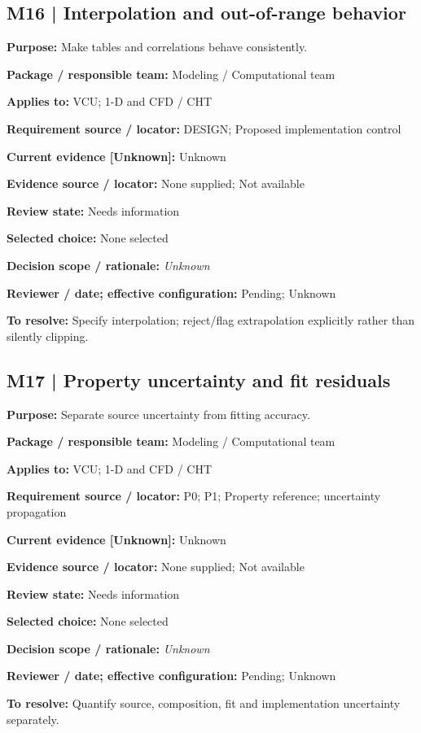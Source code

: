 \documentclass[11pt]{article}
\begin{document}
\par\noindent\begin{minipage}{\textwidth}\small\setlength{\parskip}{2pt}
\subsection*{M16 | Interpolation and out-of-range behavior}
\textbf{Purpose:} Make tables and correlations behave consistently.\par
\textbf{Package / responsible team:} Modeling / Computational team\par
\textbf{Applies to:} VCU; 1-D and CFD / CHT\par
\textbf{Requirement source / locator:} DESIGN; Proposed implementation control\par
\textbf{Current evidence [Unknown]:} Unknown\par
\textbf{Evidence source / locator:} None supplied; Not available\par
\textbf{Review state:} Needs information\par
\textbf{Selected choice:} None selected\par
\textbf{Decision scope / rationale:} \textit{Unknown}\par
\textbf{Reviewer / date; effective configuration:} Pending; Unknown\par
\textbf{To resolve:} Specify interpolation; reject/flag extrapolation explicitly rather than silently clipping.\par
\end{minipage}\par\vspace{5pt}
\par\noindent\begin{minipage}{\textwidth}\small\setlength{\parskip}{2pt}
\subsection*{M17 | Property uncertainty and fit residuals}
\textbf{Purpose:} Separate source uncertainty from fitting accuracy.\par
\textbf{Package / responsible team:} Modeling / Computational team\par
\textbf{Applies to:} VCU; 1-D and CFD / CHT\par
\textbf{Requirement source / locator:} P0; P1; Property reference; uncertainty propagation\par
\textbf{Current evidence [Unknown]:} Unknown\par
\textbf{Evidence source / locator:} None supplied; Not available\par
\textbf{Review state:} Needs information\par
\textbf{Selected choice:} None selected\par
\textbf{Decision scope / rationale:} \textit{Unknown}\par
\textbf{Reviewer / date; effective configuration:} Pending; Unknown\par
\textbf{To resolve:} Quantify source, composition, fit and implementation uncertainty separately.\par
\end{minipage}\par\vspace{5pt}
\end{document}
